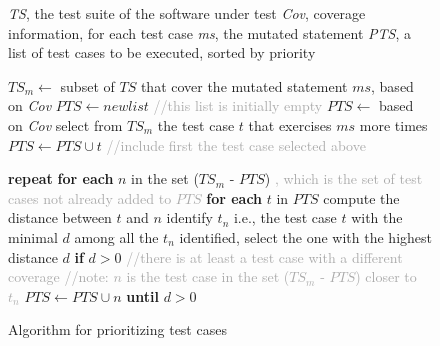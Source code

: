 
\newcommand{\INDA}{10}
\newcommand{\INDB}{15}
\newcommand{\INDC}{5}

\begin{figure}[h]

\begin{algorithmic}[1]

\scriptsize
\Require \emph{TS}, the test suite of the software under test
\Require \emph{Cov}, coverage information, for each test case
\Require \emph{ms}, the mutated statement
\Ensure \emph{PTS}, a list of test cases to be executed, sorted by priority

\State $\mathit{TS}_m \gets$ subset of $\mathit{TS}$ that cover the mutated statement $\mathit{ms}$, based on \emph{Cov} \label{alg:prioritize:select}
\State $\mathit{PTS} \gets \mathit{new} \mathit{list}$ \textcolor{darkgray}{//this list is initially empty}
\State $\mathit{PTS} \gets$ based on \emph{Cov} select from $\mathit{TS_m}$ the test case $t$ that exercises $\mathit{ms}$ more times \label{alg:prioritize:first}
\State $\mathit{PTS} \gets \mathit{PTS} \cup t$ \textcolor{darkgray}{//include first the test case selected above}  \label{alg:prioritize:add}

\State \textbf{repeat} \label{alg:prioritize:repeat}
\State \hspace{\INDC mm} \textbf{for each} $n$ in the set ($\mathit{TS}_m$ - $\mathit{PTS}$) \textcolor{darkgray}{, which is the set of test cases not already added to $\mathit{PTS}$} \label{alg:prioritize:notSel}
\State \hspace{\INDA mm} \textbf{for each} $t$ in $\mathit{PTS}$
\State \hspace{\INDB mm} compute the distance between $t$ and $n$
\State \hspace{\INDA mm} identify $t_n$ i.e., the test case $t$ with the minimal $d$ \label{alg:prioritize:minD}
\State \hspace{\INDC mm} among all the $t_n$ identified, select the one with the highest distance $d$ \label{alg:prioritize:selectStart}
\State \hspace{\INDC mm} \textbf{if} $d > 0$ \textcolor{darkgray}{//there is at least a test case with a different coverage}
\State \hspace{\INDA mm} \textcolor{darkgray}{//note: $n$ is the test case in the set ($\mathit{TS}_m$ - $\mathit{PTS}$) closer to $t_n$}
\State \hspace{\INDA mm} $\mathit{PTS} \gets \mathit{PTS} \cup n$ \label{alg:prioritize:selectEnd}
\State \textbf{until} $d > 0$ \label{alg:prioritize:until}


\end{algorithmic}
\vspace{-3mm}
\caption{Algorithm for prioritizing test cases}
\label{alg:prioritize}
\end{figure}


